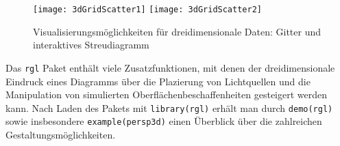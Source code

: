 \begin{figure}[ht]
\centering
\texttt{[image: 3dGridScatter1]}
\texttt{[image: 3dGridScatter2]}
\vspace*{-0.5em}
\caption{Visualisierungsmöglichkeiten für dreidimensionale Daten: Gitter und interaktives Streudiagramm}
\label{fig:3dTwo}
\end{figure}

Das \lstinline!rgl! Paket enthält viele Zusatzfunktionen, mit denen der dreidimensionale Eindruck eines Diagramms über die Plazierung von Lichtquellen und die Manipulation von simulierten Oberflächenbeschaffenheiten gesteigert werden kann. Nach Laden des Pakets mit \lstinline!library(rgl)! erhält man durch \lstinline!demo(rgl)! sowie insbesondere \lstinline!example(persp3d)! einen Überblick über die zahlreichen Gestaltungsmöglichkeiten.

